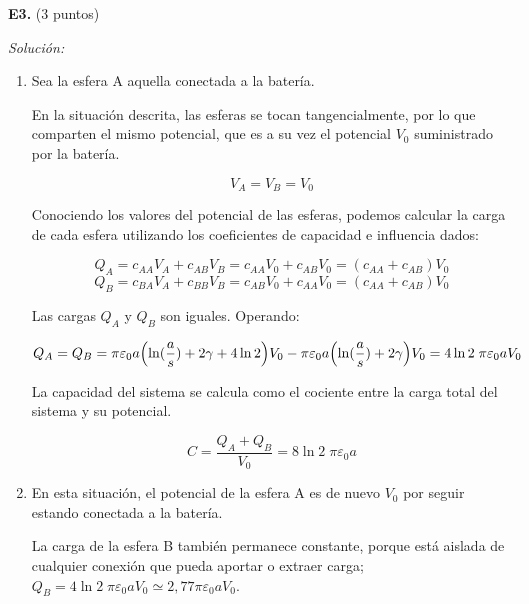 \textbf{E3.} (3 puntos)


\vspace{20px}
\textit{Solución:}
\\

\begin{enumerate}
[label=\alph*)]
    \item Sea la esfera A aquella conectada a la batería.

    En la situación descrita, las esferas se tocan tangencialmente, por lo que comparten el mismo potencial, que es a su vez el potencial $V_0$ suministrado por la batería.

    \begin{equation*}
        V_A = V_B = V_0
    \end{equation*}

    Conociendo los valores del potencial de las esferas, podemos calcular la carga de cada esfera utilizando los coeficientes de capacidad e influencia dados:


    \begin{equation*}
        Q_A = c_{AA}  V_A + c_{AB} V_B = c_{AA}  V_0 + c_{AB} V_0 = (c_{AA} + c_{AB}) V_0
    \end{equation*}
    \begin{equation*}
        Q_B = c_{BA}  V_A + c_{BB} V_B = c_{AB}  V_0 + c_{AA} V_0 = (c_{AA} + c_{AB}) V_0
    \end{equation*}

    Las cargas $Q_A$ y $Q_B$ son iguales. Operando:

    \begin{equation*}
        Q_A = Q_B = \pi \varepsilon_0 a \Bigl( \ln(\frac{a}{s}) + 2 \gamma + 4 \ln2 \Bigr)  V_0 - \pi \varepsilon_0 a \Bigl( \ln(\frac{a}{s}) + 2 \gamma \Bigr)   V_0 =
        4 \ln2\;\pi \varepsilon_0 a V_0
    \end{equation*}

    La capacidad del sistema se calcula como el cociente entre la carga total del sistema y su potencial.

    \begin{equation*}
        C = \frac{Q_A + Q_B}{V_0} = 8 \ln2\;\pi \varepsilon_0 a
    \end{equation*}

    \vspace{20px}
    \item En esta situación, el potencial de la esfera A es de nuevo $V_0$ por seguir estando conectada a la batería.

    La carga de la esfera B también permanece constante, porque
    está aislada de cualquier conexión que pueda aportar o extraer carga;
    $Q_B =  4 \ln2\;\pi \varepsilon_0 a V_0  \simeq  2,77 \pi \varepsilon_0 a V_0$.


\end{enumerate}
